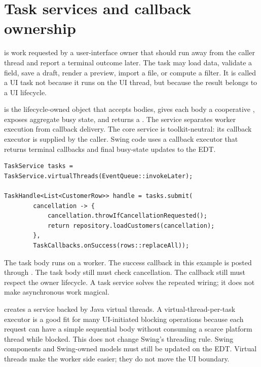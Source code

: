 \section{Task services and callback ownership}

 is work requested by a user-interface owner that
should run away from the caller thread and report a terminal outcome later. The
task may load data, validate a field, save a draft, render a preview, import a
file, or compute a filter. It is called a UI task not because it runs on the
UI thread, but because the result belongs to a UI lifecycle.

 is the lifecycle-owned object that accepts
 bodies, gives each body a cooperative ,
exposes aggregate busy state, and returns a . The service
separates worker execution from callback delivery. The core service is
toolkit-neutral: its callback executor is supplied by the caller. Swing code
uses a callback executor that returns terminal callbacks and final busy-state
updates to the EDT.

\begin{lstlisting}[caption={Submitting a task through a service.}]
TaskService tasks = TaskService.virtualThreads(EventQueue::invokeLater);

TaskHandle<List<CustomerRow>> handle = tasks.submit(
        cancellation -> {
            cancellation.throwIfCancellationRequested();
            return repository.loadCustomers(cancellation);
        },
        TaskCallbacks.onSuccess(rows::replaceAll));
\end{lstlisting}

The task body runs on a worker. The success callback in this example is posted
through . The task body still must check
cancellation. The callback still must respect the owner lifecycle. A task
service solves the repeated wiring; it does not make asynchronous work
magical.

 creates a service backed by Java virtual
threads. A virtual-thread-per-task executor is a good fit for many UI-initiated
blocking operations because each request can have a simple sequential body
without consuming a scarce platform thread while blocked. This does not change
Swing's threading rule. Swing components and Swing-owned models must still be
updated on the EDT. Virtual threads make the worker side easier; they do not
move the UI boundary.

